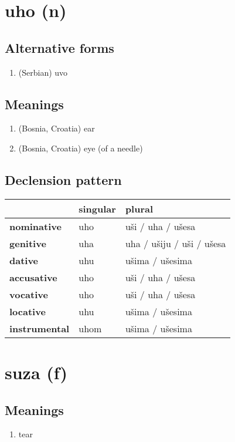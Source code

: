 \filbreak
\section{uho (n)}
\subsection*{Alternative forms}
\begin{enumerate}
\item (Serbian) uvo
\end{enumerate}
\subsection*{Meanings}
\begin{enumerate}
\item (Bosnia, Croatia) ear
\item (Bosnia, Croatia) eye (of a needle)
\end{enumerate}
\subsection*{Declension pattern}
\begin{tabularx}{\linewidth}{Xll}
\toprule
{} & singular &                     plural \\
\midrule
\textbf{nominative  } &      uho &          uši / uha / ušesa \\
\textbf{genitive    } &      uha &  uha / ušiju / uši / ušesa \\
\textbf{dative      } &      uhu &            ušima / ušesima \\
\textbf{accusative  } &      uho &          uši / uha / ušesa \\
\textbf{vocative    } &      uho &          uši / uha / ušesa \\
\textbf{locative    } &      uhu &            ušima / ušesima \\
\textbf{instrumental} &     uhom &            ušima / ušesima \\
\bottomrule
\end{tabularx}

\filbreak
\section{suza (f)}
\subsection*{Meanings}
\begin{enumerate}
\item tear
\end{enumerate}
